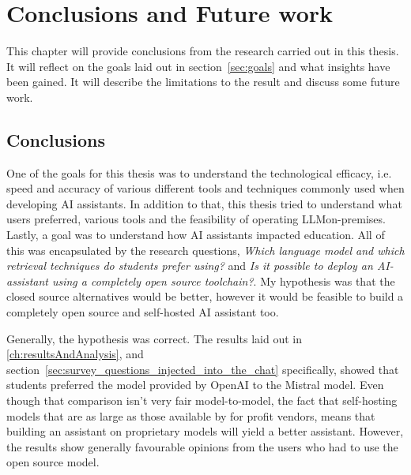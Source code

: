 ﻿\chapter{Conclusions and Future work}
\label{ch:conclusionsAndFutureWork}




This chapter will provide conclusions from the research carried out in this thesis. It will reflect on the goals laid out in section~\ref{sec:goals} and what insights have been gained. It will describe the limitations to the result and discuss some future work.


\section{Conclusions}
\label{sec:conclusions}




One of the goals for this thesis was to understand the technological efficacy, i.e. speed and accuracy of various different tools and techniques commonly used when developing AI assistants. In addition to that, this thesis tried to understand what users preferred, various tools and the feasibility of operating \gls{LLM}on-premises. Lastly, a goal was to understand how AI assistants impacted education. All of this was encapsulated by the research questions, \textit{Which language model and which retrieval techniques do students prefer using?} and \textit{Is it possible to deploy an AI-assistant using a completely open source toolchain?}. My hypothesis was that the closed source alternatives would be better, however it would be feasible to build a completely open source and self-hosted AI assistant too.




Generally, the hypothesis was correct. The results laid out in \autoref{ch:resultsAndAnalysis}, and section~\ref{sec:survey_questions_injected_into_the_chat} specifically, showed that students preferred the model provided by OpenAI to the Mistral model. Even though that comparison isn’t very fair model-to-model, the fact that self-hosting models that are as large as those available by for profit vendors, means that building an assistant on proprietary models will yield a better assistant. However, the results show generally favourable opinions from the users who had to use the open source model.


